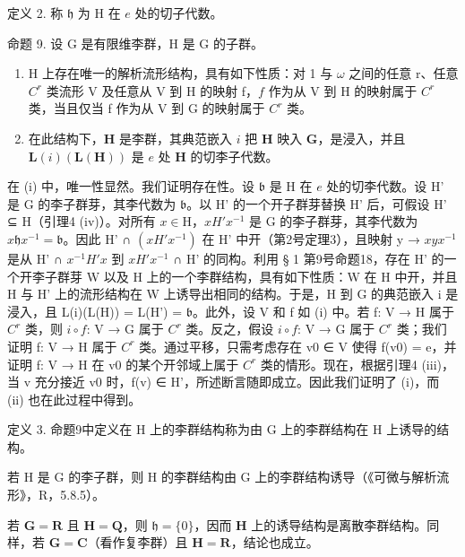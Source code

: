 定义 2. 称 \(\mathfrak{h}\) 为 H 在 \(e\) 处的切子代数。

命题 9. 设 G 是有限维李群，H 是 G 的子群。

\begin{enumerate}
\def\labelenumi{(\roman{enumi})}
\item
  H 上存在唯一的解析流形结构，具有如下性质：对 1 与 \(\omega\) 之间的任意 r、任意 \(C^r\) 类流形 V 及任意从 V 到 H 的映射 f，\(f\) 作为从 V 到 H 的映射属于 \(C^r\) 类，当且仅当 f 作为从 V 到 G 的映射属于 \(C^r\) 类。
\item
  在此结构下，\(\mathbf{H}\) 是李群，其典范嵌入 \(i\) 把 \(\mathbf{H}\) 映入 \(\mathbf{G}\)，是浸入，并且 \(\mathbf{L}(i)(\mathbf{L}(\mathbf{H}))\) 是 \(e\) 处 \(\mathbf{H}\) 的切李子代数。
\end{enumerate}

在 (i) 中，唯一性显然。我们证明存在性。设 \(\mathfrak{b}\) 是 H 在 \(e\) 处的切李代数。设 H' 是 G 的李子群芽，其李代数为 \(\mathfrak{b}\)。以 H' 的一个开子群芽替换 H' 后，可假设 H' ⊆ H（引理4 (iv)）。对所有 \(x \in \mathrm{H}\)，\(xH'x^{-1}\) 是 G 的李子群芽，其李代数为 \(x \mathfrak{h}x^{-1} = \mathfrak{b}\)。因此 H' ∩ \((xH'x^{-1})\) 在 H' 中开（第2号定理3），且映射 y → \(xyx^{-1}\) 是从 H' ∩ \(x^{-1}H'x\) 到 \(xH'x^{-1}\) ∩ H' 的同构。利用 § 1 第9号命题18，存在 H' 的一个开李子群芽 W 以及 H 上的一个李群结构，具有如下性质：W 在 H 中开，并且 H 与 H' 上的流形结构在 W 上诱导出相同的结构。于是，H 到 G 的典范嵌入 i 是浸入，且 L(i)(L(H)) = L(H') = \(\mathfrak{b}\)。此外，设 V 和 f 如 (i) 中。若 f: V → H 属于 \(C^r\) 类，则 \(i \circ f\): V → G 属于 \(C^r\) 类。反之，假设 \(i \circ f\): V → G 属于 \(C^r\) 类；我们证明 f: V → H 属于 \(C^r\) 类。通过平移，只需考虑存在 v0 ∈ V 使得 f(v0) = e，并证明 f: V → H 在 v0 的某个开邻域上属于 \(C^r\) 类的情形。现在，根据引理4 (iii)，当 v 充分接近 v0 时，f(v) ∈ H'，所述断言随即成立。因此我们证明了 (i)，而 (ii) 也在此过程中得到。

定义 3. 命题9中定义在 H 上的李群结构称为由 G 上的李群结构在 H 上诱导的结构。

若 H 是 G 的李子群，则 H 的李群结构由 G 上的李群结构诱导（《可微与解析流形》，R，5.8.5）。

若 \(\mathbf{G} = \mathbf{R}\) 且 \(\mathbf{H} = \mathbf{Q}\)，则 \(\mathfrak{h} = \{0\}\)，因而 \(\mathbf{H}\) 上的诱导结构是离散李群结构。同样，若 \(\mathbf{G} = \mathbf{C}\)（看作复李群）且 \(\mathbf{H} = \mathbf{R}\)，结论也成立。
\relax{}
